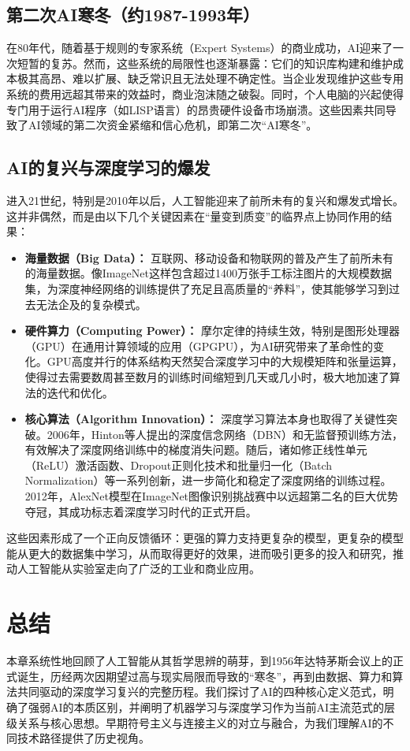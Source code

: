 \subsection{第二次AI寒冬（约1987-1993年）}
\label{ssec:second_winter}
在80年代，随着基于规则的专家系统（Expert Systems）\cite{shehadeh2024expert}的商业成功，AI迎来了一次短暂的复苏。然而，这些系统的局限性也逐渐暴露：它们的知识库构建和维护成本极其高昂、难以扩展、缺乏常识且无法处理不确定性。当企业发现维护这些专用系统的费用远超其带来的效益时，商业泡沫随之破裂。同时，个人电脑的兴起使得专门用于运行AI程序（如LISP语言）的昂贵硬件设备市场崩溃。这些因素共同导致了AI领域的第二次资金紧缩和信心危机，即第二次“AI寒冬”。

\subsection{AI的复兴与深度学习的爆发}
\label{ssec:ai_resurgence}
进入21世纪，特别是2010年以后，人工智能迎来了前所未有的复兴和爆发式增长。这并非偶然，而是由以下几个关键因素在“量变到质变”的临界点上协同作用的结果：
\begin{itemize}
    \item \textbf{海量数据（Big Data）：} 互联网、移动设备和物联网的普及产生了前所未有的海量数据。像ImageNet这样包含超过1400万张手工标注图片的大规模数据集，为深度神经网络的训练提供了充足且高质量的“养料”，使其能够学习到过去无法企及的复杂模式。
    \item \textbf{硬件算力（Computing Power）：} 摩尔定律的持续生效，特别是图形处理器（GPU）在通用计算领域的应用（GPGPU），为AI研究带来了革命性的变化。GPU高度并行的体系结构天然契合深度学习中的大规模矩阵和张量运算，使得过去需要数周甚至数月的训练时间缩短到几天或几小时，极大地加速了算法的迭代和优化。
    \item \textbf{核心算法（Algorithm Innovation）：}\cite{xu2022separable} 深度学习算法本身也取得了关键性突破。2006年，Hinton等人提出的深度信念网络（DBN）和无监督预训练方法，有效解决了深度网络训练中的梯度消失问题。随后，诸如修正线性单元（ReLU）激活函数、Dropout正则化技术和批量归一化（Batch Normalization）等一系列创新，进一步简化和稳定了深度网络的训练过程。2012年，AlexNet模型在ImageNet图像识别挑战赛中以远超第二名的巨大优势夺冠，其成功标志着深度学习时代的正式开启。
\end{itemize}
这些因素形成了一个正向反馈循环：更强的算力支持更复杂的模型，更复杂的模型能从更大的数据集中学习，从而取得更好的效果，进而吸引更多的投入和研究，推动人工智能从实验室走向了广泛的工业和商业应用。

\section{总结}
\label{sec:conclusion_chap1}
本章系统性地回顾了人工智能从其哲学思辨的萌芽，到1956年达特茅斯会议上的正式诞生，历经两次因期望过高与现实局限而导致的“寒冬”，再到由数据、算力和算法共同驱动的深度学习复兴的完整历程。我们探讨了AI的四种核心定义范式，明确了强弱AI的本质区别，并阐明了机器学习与深度学习作为当前AI主流范式的层级关系与核心思想。早期符号主义与连接主义的对立与融合，为我们理解AI的不同技术路径提供了历史视角。

